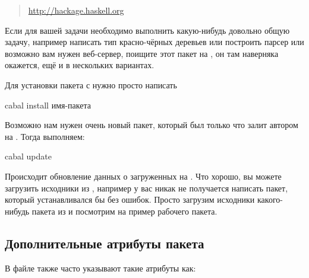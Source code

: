 \begin{quote}
\url{http://hackage.haskell.org}
\end{quote}

Если для вашей задачи необходимо выполнить какую-нибудь
довольно общую задачу, например написать тип красно-чёрных
деревьев или построить парсер или возможно вам нужен веб-сервер,
поищите этот пакет на , он там наверняка окажется,
ещё и в нескольких вариантах.  

Для установки пакета с  нужно просто написать

\begin{code}
cabal install имя-пакета
\end{code}

Возможно нам нужен очень новый пакет, который был 
только что залит автором на . Тогда выполняем:

\begin{code}
cabal update
\end{code}

Происходит обновление данных о загруженных на .
Что хорошо, вы можете
загрузить исходники из , например у вас никак 
не получается написать пакет, который устанавливался бы без
ошибок. Просто загрузим исходники какого-нибудь пакета
из  и посмотрим на пример рабочего пакета.


\subsection{Дополнительные атрибуты пакета}

В файле  также часто указывают такие атрибуты как:




\smallskip

